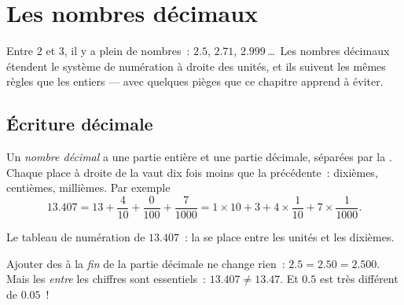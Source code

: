 \chapter{Les nombres décimaux}\label{ch:g6:decimals}

Entre $2$ et $3$, il y a plein de nombres~: $2.5$, $2.71$,
$2.999$\,\dots\ Les nombres décimaux étendent le système de
numération à droite des unités, et ils suivent les mêmes règles que
les entiers --- avec quelques pièges que ce chapitre apprend à
éviter.

\section{Écriture décimale}

\begin{definition}\label{def:g6:decimals:places}
Un \emph{nombre décimal} a une partie entière
et une partie décimale, séparées par la . Chaque place à
droite de la  vaut dix fois moins que la précédente~:
dixièmes, centièmes, millièmes. Par exemple
\[
13.407 = 13 + \frac{4}{10} + \frac{0}{100} + \frac{7}{1000}
= 1 \times 10 + 3 + 4 \times \frac{1}{10} + 7 \times \frac{1}{1000}.
\]
\end{definition}

\begin{omfigure}

{\small Le tableau de numération de $13.407$~: la  se place
entre les unités et les dixièmes.}
\end{omfigure}

\begin{remark}
Ajouter des  à la \emph{fin} de la partie décimale ne change
rien~: $2.5 = 2.50 = 2.500$. Mais les  \emph{entre} les chiffres
sont essentiels~: $13.407 \neq 13.47$. Et $0.5$ est très différent de
$0.05$~!
\end{remark}


